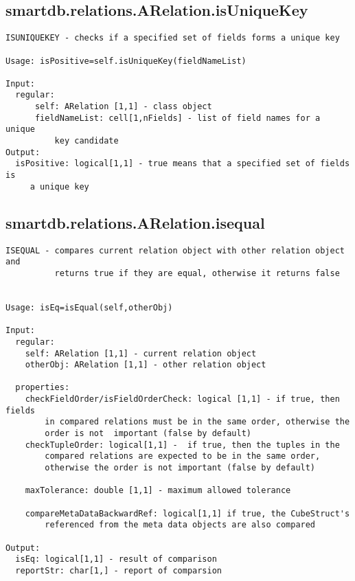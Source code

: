 \subsection{\texorpdfstring{smartdb.relations.ARelation.isUniqueKey}{isUniqueKey}}\label{method:smartdb.relations.ARelation.isUniqueKey}
\begin{verbatim}
ISUNIQUEKEY - checks if a specified set of fields forms a unique key

Usage: isPositive=self.isUniqueKey(fieldNameList)

Input:
  regular:
      self: ARelation [1,1] - class object
      fieldNameList: cell[1,nFields] - list of field names for a unique
          key candidate
Output:
  isPositive: logical[1,1] - true means that a specified set of fields is
     a unique key
\end{verbatim}
\subsection{\texorpdfstring{smartdb.relations.ARelation.isequal}{isequal}}\label{method:smartdb.relations.ARelation.isequal}
\begin{verbatim}
ISEQUAL - compares current relation object with other relation object and
          returns true if they are equal, otherwise it returns false


Usage: isEq=isEqual(self,otherObj)

Input:
  regular:
    self: ARelation [1,1] - current relation object
    otherObj: ARelation [1,1] - other relation object

  properties:
    checkFieldOrder/isFieldOrderCheck: logical [1,1] - if true, then fields
        in compared relations must be in the same order, otherwise the
        order is not  important (false by default)
    checkTupleOrder: logical[1,1] -  if true, then the tuples in the
        compared relations are expected to be in the same order,
        otherwise the order is not important (false by default)

    maxTolerance: double [1,1] - maximum allowed tolerance

    compareMetaDataBackwardRef: logical[1,1] if true, the CubeStruct's
        referenced from the meta data objects are also compared

Output:
  isEq: logical[1,1] - result of comparison
  reportStr: char[1,] - report of comparsion
\end{verbatim}
